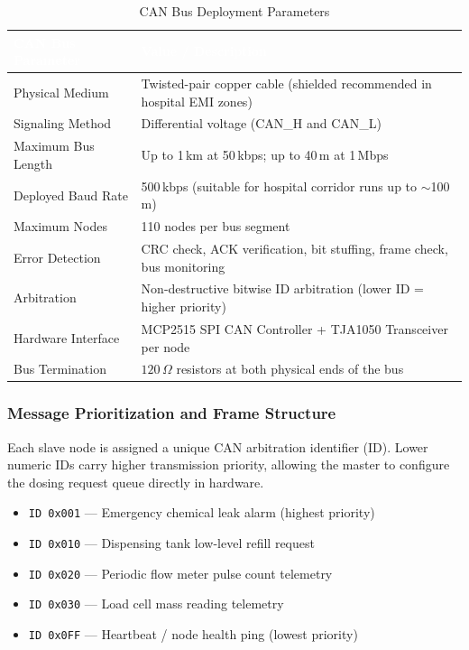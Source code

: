 \documentclass[12pt,a4paper]{article}
\begin{document}
\begin{table}[H]
\centering
\setlength{\tabcolsep}{5pt}
\renewcommand{\arraystretch}{1.4}
\begin{tabular}{|p{4cm}|p{9.5cm}|}
\hline
\rowcolor{headerblue}
\textcolor{white}{\textbf{CAN Bus Parameter}} &
\textcolor{white}{\textbf{Value / Description}} \\
\hline
Physical Medium & Twisted-pair copper cable (shielded recommended in hospital EMI zones) \\
\hline
\rowcolor{rowgray}
Signaling Method & Differential voltage (CAN\_H and CAN\_L) \\
\hline
Maximum Bus Length & Up to 1\,km at 50\,kbps; up to 40\,m at 1\,Mbps \\
\hline
\rowcolor{rowgray}
Deployed Baud Rate & 500\,kbps (suitable for hospital corridor runs up to $\sim$100\,m) \\
\hline
Maximum Nodes & 110 nodes per bus segment \\
\hline
\rowcolor{rowgray}
Error Detection & CRC check, ACK verification, bit stuffing, frame check, bus monitoring \\
\hline
Arbitration & Non-destructive bitwise ID arbitration (lower ID = higher priority) \\
\hline
\rowcolor{rowgray}
Hardware Interface & MCP2515 SPI CAN Controller + TJA1050 Transceiver per node \\
\hline
Bus Termination & $120\,\Omega$ resistors at both physical ends of the bus \\
\hline
\end{tabular}
\caption{CAN Bus Deployment Parameters}
\end{table}

\subsubsection*{Message Prioritization and Frame Structure}

Each slave node is assigned a unique CAN arbitration identifier (ID). Lower numeric IDs carry higher transmission priority, allowing the master to configure the dosing request queue directly in hardware.

\begin{itemize}
    \item \texttt{ID 0x001} --- Emergency chemical leak alarm (highest priority)
    \item \texttt{ID 0x010} --- Dispensing tank low-level refill request
    \item \texttt{ID 0x020} --- Periodic flow meter pulse count telemetry
    \item \texttt{ID 0x030} --- Load cell mass reading telemetry
    \item \texttt{ID 0x0FF} --- Heartbeat / node health ping (lowest priority)
\end{itemize}
\end{document}
